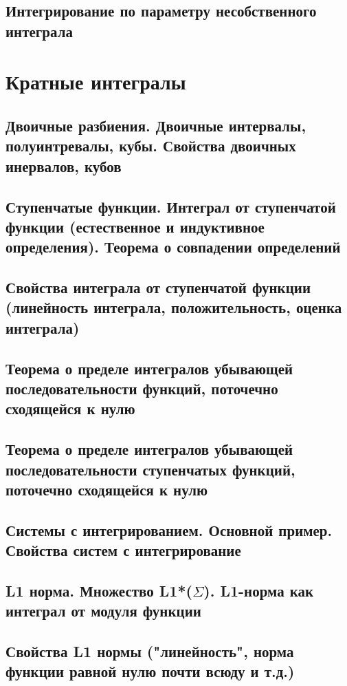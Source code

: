 \documentclass[a4paper]{article}
\theoremstyle{definition}
\theoremstyle{remark}
\begin{document}
    \subsection{	Интегрирование по параметру несобственного интеграла}
    
    \section{Кратные интегралы}
    \subsection{ Двоичные разбиения. Двоичные интервалы, полуинтревалы, кубы. Свойства двоичных инервалов, кубов}
    \subsection{ Ступенчатые функции. Интеграл от ступенчатой функции (естественное и индуктивное определения). Теорема о совпадении определений}
    \subsection{ Свойства интеграла от ступенчатой функции (линейность интеграла, положительность, оценка интеграла)}
    \subsection{ Теорема о пределе интегралов убывающей последовательности функций, поточечно сходящейся к нулю}
    \subsection{ Теорема о пределе интегралов убывающей последовательности ступенчатых функций, поточечно сходящейся к нулю}
    \subsection{ Системы с интегрированием. Основной пример. Свойства систем с интегрирование}
    \subsection{ L1 норма. Множество L1*($\Sigma$). L1-норма как интеграл от модуля функции}
    \subsection{ Свойства L1 нормы ("линейность", норма функции равной нулю почти всюду и т.д.)}
\end{document}
